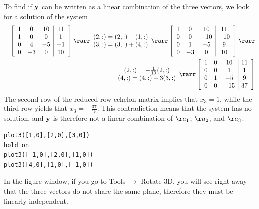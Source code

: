 To find if ${\bf y}$ can be written as a linear combination of the three vectors, we look for a solution of the system
\begin{eqnarray*}
&&\left[\begin{array}{ccc|c}1&0&10&11 \\ 1&0&0&1 \\ 0&4&-5&-1 \\ 0&-3&0&10\end{array}\right]\rarr \begin{array}{c}(2,:)=(2,:)-(1,:)\\(3,:)=(3,:)+(4,:)\end{array}\rarr
\left[\begin{array}{ccc|c}1&0&10&11 \\ 0&0&-10&-10 \\ 0&1&-5&9 \\ 0&-3&0&10\end{array}\right]\rarr\\
&&\begin{array}{c}(2,:)=-\frac{1}{10}(2,:)\\(4,:)=(4,:)+3(3,:)\end{array}\rarr
\left[\begin{array}{ccc|c}1&0&10&11 \\ 0&0&1&1 \\ 0&1&-5&9 \\ 0&0&-15&37\end{array}\right]
\end{eqnarray*}
The second row of the reduced row echelon matrix implies that $x_3=1$, 
while the third row yields that $x_3 = -\frac{37}{15}$. This contradiction 
means that the system has no solution, and ${\bf y}$ is therefore not a 
linear combination of $\aa_1$, $\aa_2$, and $\aa_3$.

\vspace{2mm}
\begin{verbatim}
plot3([1,0],[2,0],[3,0])
hold on
plot3([-1,0],[2,0],[1,0])
plot3([4,0],[1,0],[-1,0])
\end{verbatim}
In the figure window, if you go to Tools $\rightarrow$ Rotate 3D, you will see right away that the three vectors do not share the same plane, therefore they must be linearly independent.

